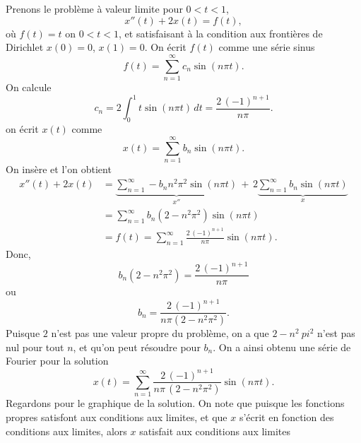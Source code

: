 \begin{example}
Prenons le problème à valeur limite pour $0 < t < 1$,
\begin{equation*}
x''(t) + 2 x(t) = f(t) ,
\end{equation*}
où $f(t) = t$ on $0 < t < 1$, et satisfaisant à la condition aux frontières de Dirichlet  $x(0) = 0$, $x(1)=0$.
On écrit $f(t)$ comme une série sinus
\begin{equation*}
f(t) = \sum_{n=1}^\infty c_n \sin (n \pi t) .
\end{equation*}
On calcule
\begin{equation*}
c_n = 2 \int_0^1 t \sin (n \pi t) \,dt = \frac{2 \, {(-1)}^{n+1}}{n \pi} .
\end{equation*}
on écrit  $x(t)$ comme
\begin{equation*}
x(t) = \sum_{n=1}^\infty b_n \sin (n \pi t) .
\end{equation*}
On insère et l'on obtient
\begin{equation*}
\begin{split}
x''(t) + 2 x(t) & =
\underbrace{
\sum_{n=1}^\infty - b_n n^2 \pi^2 \sin (n \pi t)
}_{x''}
\,
+
\,
2
\underbrace{
\sum_{n=1}^\infty b_n \sin (n \pi t)
}_{x}
\\
& =
\sum_{n=1}^\infty b_n (2 - n^2 \pi^2 ) \sin (n \pi t)
\\
& = f(t)
=
\sum_{n=1}^\infty  \frac{2\, {(-1)}^{n+1}}{n \pi} \sin (n \pi t) .
\end{split}
\end{equation*}
Donc,
\begin{equation*}
b_n (2 - n^2 \pi^2)
=
\frac{2\,{(-1)}^{n+1}}{n \pi}
\end{equation*}
ou
\begin{equation*}
b_n
=
\frac{2\,{(-1)}^{n+1}}{n \pi (2 - n^2 \pi^2)} .
\end{equation*}
Puisque $ 2 $ n'est pas une valeur propre du problème, on a que $ 2-n ^ 2 \ pi ^ 2 $ n'est pas nul pour tout $ n $, et qu'on peut résoudre pour $ b_n $. On a ainsi obtenu une série de Fourier pour la solution
\begin{equation*}
x(t) = 
\sum_{n=1}^\infty
\frac{2\,{(-1)}^{n+1}}{n \pi \,(2 - n^2 \pi^2)}
\sin (n \pi t) .
\end{equation*}
Regardons  pour le graphique de la solution.
On note que puisque les fonctions propres satisfont aux conditions aux limites,
et que $ x $ s'écrit en fonction des conditions aux limites, alors $ x $
satisfait aux conditions aux limites
\begin{myfig}
\capstart
{}
\caption{Graphe de la solution de $x''+2x=t$, $x(0)=0$, $x(1)=0$.%
\label{bnd-dirich-graph:fig}}
\end{myfig}
\end{example}


